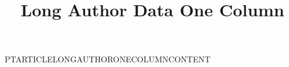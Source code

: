 \documentclass[onecolumn,coreonly,nominted]{pt-article}
\title{Long Author Data One Column}
\begin{document}
\noindent PTARTICLELONGAUTHORONECOLUMNCONTENT
\end{document}
